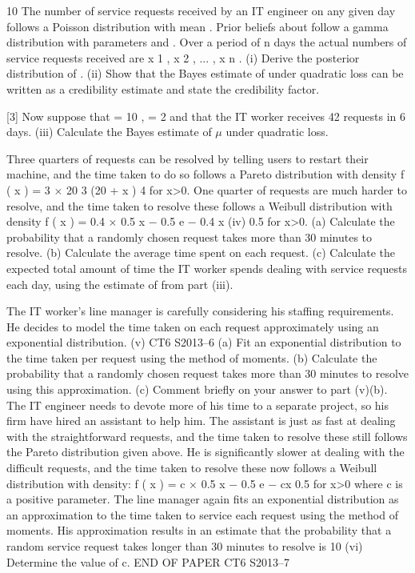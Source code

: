 10
The number of service requests received by an IT engineer on any given day follows a
Poisson distribution with mean \mu . Prior beliefs about \mu follow a gamma distribution
with parameters \alpha and \lambda . Over a period of n days the actual numbers of service
requests received are x 1 , x 2 , ... , x n .
(i) Derive the posterior distribution of \mu .
(ii) Show that the Bayes estimate of \mu under quadratic loss can be written as a
credibility estimate and state the credibility factor.

[3]
Now suppose that \alpha = 10 , \lambda = 2 and that the IT worker receives 42 requests in
6 days.
(iii)
Calculate the Bayes estimate of $\mu$ under quadratic loss.

Three quarters of requests can be resolved by telling users to restart their machine,
and the time taken to do so follows a Pareto distribution with density
f ( x ) =
3 × 20 3
(20 + x ) 4
for x>0.
One quarter of requests are much harder to resolve, and the time taken to resolve these
follows a Weibull distribution with density
f ( x ) = 0.4 × 0.5 x − 0.5 e − 0.4 x
(iv)
0.5
for x>0.
(a) Calculate the probability that a randomly chosen request takes more
than 30 minutes to resolve.
(b) Calculate the average time spent on each request.
(c) Calculate the expected total amount of time the IT worker spends
dealing with service requests each day, using the estimate of \mu from
part (iii).

The IT worker’s line manager is carefully considering his staffing requirements. He
decides to model the time taken on each request approximately using an exponential
distribution.
(v)
CT6 S2013–6
(a) Fit an exponential distribution to the time taken per request using the
method of moments.
(b) Calculate the probability that a randomly chosen request takes more
than 30 minutes to resolve using this approximation.
(c) Comment briefly on your answer to part (v)(b).
The IT engineer needs to devote more of his time to a separate project, so his firm
have hired an assistant to help him. The assistant is just as fast at dealing with the
straightforward requests, and the time taken to resolve these still follows the Pareto
distribution given above. He is significantly slower at dealing with the difficult
requests, and the time taken to resolve these now follows a Weibull distribution with
density:
f ( x ) = c × 0.5 x − 0.5 e − cx
0.5
for x>0
where c is a positive parameter. The line manager again fits an exponential
distribution as an approximation to the time taken to service each request using the
method of moments. His approximation results in an estimate that the probability that
a random service request takes longer than 30 minutes to resolve is 10%
(vi)
Determine the value of c.
END OF PAPER
CT6 S2013–7

